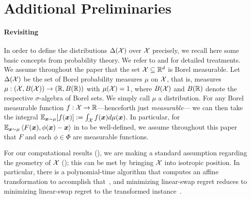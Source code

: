 \section{Additional Preliminaries}
\label{sec:add-prels}

\paragraph{Revisiting } 

In order to define the distributions $\Delta({\mathcal{X}})$ over ${\mathcal{X}}$ precisely, we recall here some basic concepts from probability theory. We refer to \citet[Chapter 1 and 2]{Billingsley99:Convergence} and \citet[Chapter 15]{AliprantisB06:Infinite} for detailed treatments. We assume throughout the paper that the set ${\mathcal{X}} \subseteq \mathbb R^d$ is Borel measurable. Let $\Delta({\mathcal{X}})$ be the set of Borel probability measures $\mu$ on ${\mathcal{X}}$, that is, measures $\mu: \qty({\mathcal{X}}, B({\mathcal{X}})) \to \qty(\mathbb R, B(\mathbb R))$ with $\mu({\mathcal{X}}) = 1$, where $B({\mathcal{X}})$ and $B(\mathbb R)$ denote the respective $\sigma$-algebra of Borel sets. We simply call $\mu$ a distribution. For any Borel measurable function $f : {\mathcal{X}} \to \mathbb R$---henceforth just \emph{measurable}--- we can then take the integral $\operatorname*{\mathbb E}_{{\bm{x}} \sim \mu}[f({\bm{x}})] := \int_{\mathcal{X}} f({\bm{x}}) d\mu({\bm{x}})$. In particular, for $\E_{\vx\sim\mu} \ip{F(\vx), \phi(\vx) - \vx}$ in  to be well-defined, we assume throughout this paper that $F$ and each $\phi \in \Phi$ are measurable functions.

For our computational results (), we are making a standard assumption regarding the geometry of ${\mathcal{X}}$ (); this can be met by bringing ${\mathcal{X}}$ into isotropic position. In particular, there is a polynomial-time algorithm that computes an affine transformation to accomplish that~\citep{Lovasz06:Simulated}, and minimizing linear-swap regret reduces to minimizing linear-swap regret to the transformed instance~\citep[Lemma A.1]{Daskalakis24:Efficient}.


